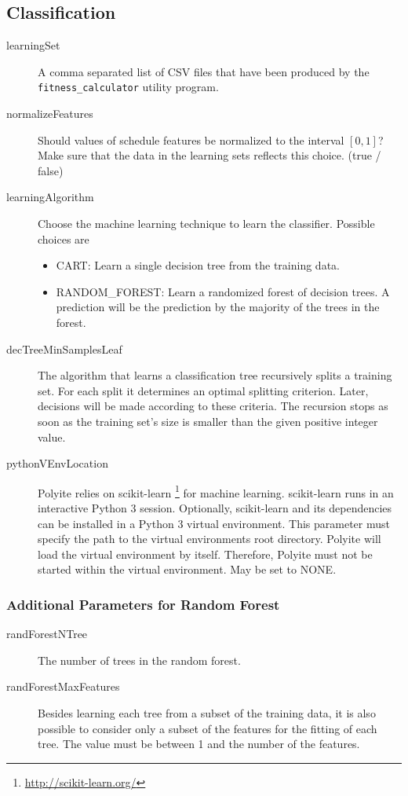 \documentclass{article}
\begin{document}
\subsection{Classification}
\begin{description}
  \item[learningSet] A comma separated list of CSV files that have been produced
    by the \texttt{fitness\_calculator} utility program.
  \item[normalizeFeatures] Should values of schedule features be normalized to
    the interval $[0, 1]$? Make sure that the data in the learning sets reflects
    this choice. (true / false)
  \item[learningAlgorithm] Choose the machine learning technique to learn the
  classifier. Possible choices are
  \begin{itemize}
    \item CART: Learn a single decision tree from the training data.
    \item RANDOM\_FOREST: Learn a randomized forest of decision trees. A
      prediction will be the prediction by the majority of the trees in the
      forest.
  \end{itemize}
  \item[decTreeMinSamplesLeaf] The algorithm that learns a classification tree
    recursively splits a training set. For each split it determines an optimal
    splitting criterion. Later, decisions will be made according to these
    criteria. The recursion stops as soon as the training set's size is smaller
    than the given positive integer value.
  \item[pythonVEnvLocation] Polyite relies on scikit-learn
    \footnote{\url{http://scikit-learn.org/}} for machine learning. scikit-learn
    runs in an interactive Python 3 session. Optionally, scikit-learn and its
    dependencies can be installed in a Python 3 virtual environment. This
    parameter must specify the path to the virtual environments root directory.
    Polyite will load the virtual environment by itself. Therefore, Polyite
    must not be started within the virtual environment. May be set to NONE.
\end{description}

\subsubsection{Additional Parameters for Random Forest}

\begin{description}
  \item[randForestNTree] The number of trees in the random forest.
  \item[randForestMaxFeatures] Besides learning each tree from a subset of the
    training data, it is also possible to consider only a subset of the features
    for the fitting of each tree. The value must be between 1 and the number of
    the features.
\end{description}
\end{document}
